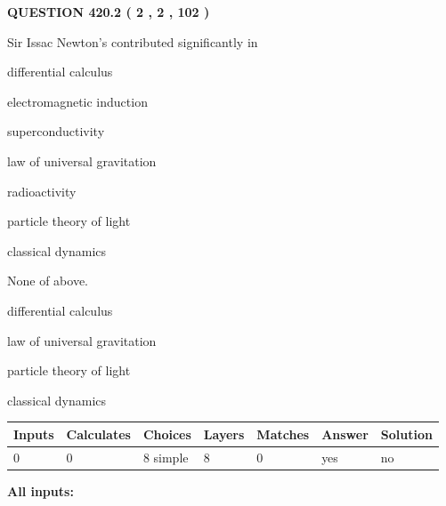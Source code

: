 \documentclass[12pt]{article}
\begin{document}
\vspace{0.2in}
  
{\textbf{\Large{QUESTION
420.2 
 ( 2 , 2 , 102 )
}}}
  
  
Sir Issac Newton's contributed significantly in
 
 
differential calculus
 
 
electromagnetic induction
 
 
superconductivity
 
 
law of universal gravitation
 
 
radioactivity
 
 
particle theory of light
 
 
classical dynamics
 
 
 None of above.
 
 
\noindent{}
 
 
differential calculus
 
 
law of universal gravitation
 
 
particle theory of light
 
 
classical dynamics
 
 
\noindent{}
 
 
   
   
   
   
\noindent\begin{tabular}{|l|l|l|l|l|l|l|}
 \hline
Inputs & Calculates & Choices & Layers & Matches & Answer & Solution \\ \hline
 0  & 
 0  & 
 8
  simple  
  & 
 8  & 
 0  & 
  yes & 
  no 
  \\ \hline
 \end{tabular}
   
   
   
   
\noindent{}
   
   
   
   
\noindent\vspace{0.1in}\hspace{-0.08in} {\textbf{\Large{All inputs: }}}
   
\end{document}
